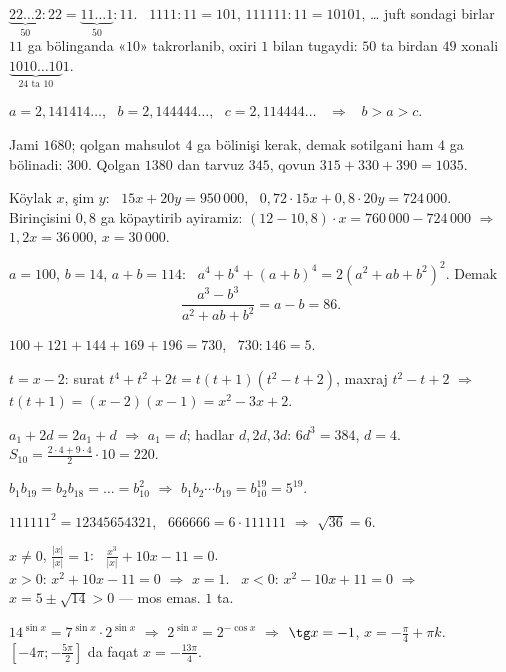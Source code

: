 




$\underbrace{22\ldots2}_{50}:22=\underbrace{11\ldots1}_{50}:11$. \ $1111:11=101$, $111111:11=10101$, … juft sondagi birlar $11$ ga bölinganda «$10$» takrorlanib, oxiri $1$ bilan tugaydi: $50$ ta birdan $49$ xonali $\underbrace{1010\ldots10}_{24\text{ ta }10}1$.

$a=2{,}141414\ldots$, \ $b=2{,}144444\ldots$, \ $c=2{,}114444\ldots$ \ $\Rightarrow$ \ $b>a>c$.

Jami $1680$; qolgan mahsulot $4$ ga bölinişi kerak, demak sotilgani ham $4$ ga bölinadi: $300$. Qolgan $1380$ dan tarvuz $345$, qovun $315+330+390=1035$.

Köylak $x$, şim $y$: \ $15x+20y=950\,000$, \ $0{,}72\cdot15x+0{,}8\cdot20y=724\,000$.\\
Birinçisini $0{,}8$ ga köpaytirib ayiramiz: $(12-10{,}8)\cdot x=760\,000-724\,000$ $\Rightarrow$ $1{,}2x=36\,000$, $x=30\,000$.

$a=100$, $b=14$, $a+b=114$: \ $a^4+b^4+(a+b)^4=2\left(a^2+ab+b^2\right)^2$. Demak
\[\frac{a^3-b^3}{a^2+ab+b^2}=a-b=86.\]

$100+121+144+169+196=730$, \ $730:146=5$.

$t=x-2$: surat $t^4+t^2+2t=t(t+1)(t^2-t+2)$, maxraj $t^2-t+2$ $\Rightarrow$ $t(t+1)=(x-2)(x-1)=x^2-3x+2$.

$a_1+2d=2a_1+d$ $\Rightarrow$ $a_1=d$; hadlar $d,2d,3d$: $6d^3=384$, $d=4$. \ $S_{10}=\frac{2\cdot4+9\cdot4}2\cdot10=220$.

$b_1b_{19}=b_2b_{18}=\ldots=b_{10}^2$ $\Rightarrow$ $b_1b_2\cdots b_{19}=b_{10}^{19}=5^{19}$.

$111111^2=12345654321$, \ $666666=6\cdot111111$ $\Rightarrow$ $\sqrt{36}=6$.

$x\ne0$, $\frac{|x|}{|x|}=1$: \ $\frac{x^3}{|x|}+10x-11=0$.\\
$x>0$: $x^2+10x-11=0$ $\Rightarrow$ $x=1$. \ $x<0$: $x^2-10x+11=0$ $\Rightarrow$ $x=5\pm\sqrt{14}>0$ — mos emas. $1$ ta.

$14^{\sin x}=7^{\sin x}\cdot2^{\sin x}$ $\Rightarrow$ $2^{\sin x}=2^{-\cos x}$ $\Rightarrow$ $\tg x=-1$, $x=-\frac\pi4+\pi k$.\\
$\left[-4\pi;-\frac{5\pi}2\right]$ da faqat $x=-\frac{13\pi}4$.


